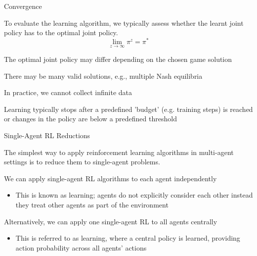 \begin{frame}{Convergence}

To evaluate the learning algorithm, we typically assess whether the learnt joint policy has  to the optimal joint policy. 
\vspace{0pt}
\[
\lim_{z \to \infty}\pi^z = \pi^*
\]
\vspace{-15pt}
\blist
    \item The optimal joint policy may differ depending on the chosen game solution
    \item There may be many valid solutions, e.g., multiple Nash equilibria
    \item In practice, we cannot collect infinite data
    \item Learning typically stops after a predefined 'budget' (e.g. training steps) is reached or changes in the policy are below a predefined threshold
\elist
    
\end{frame}


\begin{frame}[t]{Single-Agent RL Reductions}

The simplest way to apply reinforcement learning algorithms in multi-agent settings is to reduce them to single-agent problems. 

\blist
    \item We can apply single-agent RL algorithms to each agent independently
    \begin{itemize}
        \item This is known as  learning; agents do not explicitly consider each other instead they treat other agents as part of the environment
    \end{itemize}
    \item Alternatively, we can apply one single-agent RL to all agents centrally 
    \begin{itemize}
        \item This is referred to as  learning, where a central policy is learned, providing action probability across all agents' actions
    \end{itemize}
\elist
    
\end{frame}

